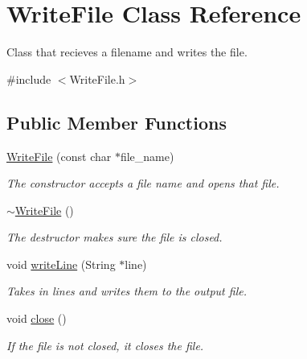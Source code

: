 \hypertarget{class_write_file}{}\section{Write\+File Class Reference}
\label{class_write_file}


Class that recieves a filename and writes the file.  




{\ttfamily \#include $<$Write\+File.\+h$>$}

\subsection*{Public Member Functions}
\begin{DoxyCompactItemize}
\item 
\mbox{\label{class_write_file_a6fe0f0b0459e0fc683cc77bdee42cc91}} 
\hyperlink{class_write_file_a6fe0f0b0459e0fc683cc77bdee42cc91}{Write\+File} (const char $\ast$file\+\_\+name)
\begin{DoxyCompactList}\small\item\em The constructor accepts a file name and opens that file. \end{DoxyCompactList}\item 
\mbox{\label{class_write_file_a52842cff5805157d22d0cf39da3200f9}} 
\hyperlink{class_write_file_a52842cff5805157d22d0cf39da3200f9}{$\sim$\+Write\+File} ()
\begin{DoxyCompactList}\small\item\em The destructor makes sure the file is closed. \end{DoxyCompactList}\item 
\mbox{\label{class_write_file_a370c9e4e3a1e966a905a5265d9b72a17}} 
void \hyperlink{class_write_file_a370c9e4e3a1e966a905a5265d9b72a17}{write\+Line} (String $\ast$line)
\begin{DoxyCompactList}\small\item\em Takes in lines and writes them to the output file. \end{DoxyCompactList}\item 
\mbox{\label{class_write_file_afc6de286ab53e3dd73812efdbc3696ff}} 
void \hyperlink{class_write_file_afc6de286ab53e3dd73812efdbc3696ff}{close} ()
\begin{DoxyCompactList}\small\item\em If the file is not closed, it closes the file. \end{DoxyCompactList}\end{DoxyCompactItemize}


